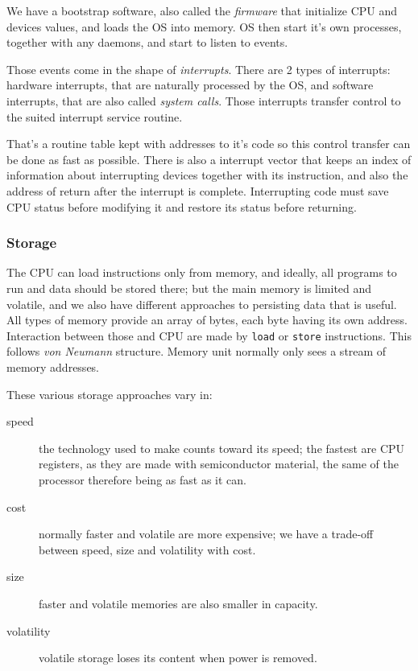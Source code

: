 \documentclass{article}
\begin{document}
We have a bootstrap software, also called the \emph{firmware} that initialize CPU and devices values, and loads the OS into memory.
OS then start it's own processes, together with any daemons, and start to listen to events.

Those events come in the shape of \emph{interrupts}. There are 2 types of interrupts: hardware interrupts, that are naturally processed by the OS, and software interrupts, that are also called \emph{system calls}. Those interrupts transfer control to the suited interrupt service routine.

That's a routine table kept with addresses to it's code so this control transfer can be done as fast as possible. There is also a interrupt vector that keeps an index of information about interrupting devices together with its instruction, and also the address of return after the interrupt is complete.
Interrupting code must save CPU status before modifying it and restore its status before returning.

\subsubsection{Storage}
The CPU can load instructions only from memory, and ideally, all programs to run and data should be stored there; but the main memory is limited and volatile, and we also have different approaches to persisting data that is useful. All types of memory provide an array of bytes, each byte having its own address. Interaction between those and CPU are made by \verb|load| or \verb|store| instructions. This follows \emph{von Neumann} structure. Memory unit normally only sees a stream of memory addresses.

These various storage approaches vary in:
\begin{description}
  \item[speed] the technology used to make counts toward its speed; the fastest are CPU registers, as they are made with semiconductor material, the same of the processor therefore being as fast as it can.
  \item[cost] normally faster and volatile are more expensive; we have a trade-off between speed, size and volatility with cost.
  \item[size] faster and volatile memories are also smaller in capacity.
  \item[volatility] volatile storage loses its content when power is removed.
\end{description}
\end{document}
